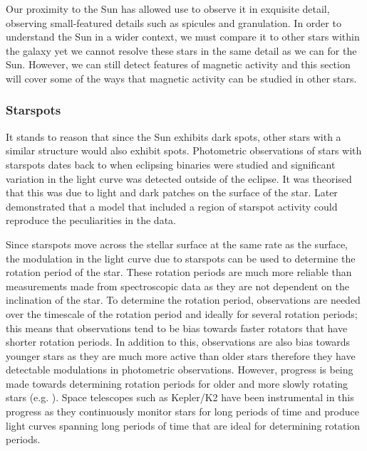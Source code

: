 Our proximity to the Sun has allowed use to observe it in exquisite detail, observing small-featured details such as spicules and granulation. In order to understand the Sun in a wider context, we must compare it to other stars within the galaxy yet we cannot resolve these stars in the same detail as we can for the Sun. However, we can still detect features of magnetic activity and this section will cover some of the ways that magnetic activity can be studied in other stars.

\subsubsection{Starspots}
\label{Chp1_starspots}
It stands to reason that since the Sun exhibits dark spots, other stars with a similar structure would also exhibit spots. Photometric observations of stars with starspots dates back to \citet{Kron_1947} when eclipsing binaries were studied and significant variation in the light curve was detected outside of the eclipse. It was theorised that this was due to light and dark patches on the surface of the star. Later \citet{Hall_1972} demonstrated that a model that included a region of starspot activity could reproduce the peculiarities in the data.

Since starspots move across the stellar surface at the same rate as the surface, the modulation in the light curve due to starspots can be used to determine the rotation period of the star. These rotation periods are much more reliable than measurements made from spectroscopic data as they are not dependent on the inclination of the star. To determine the rotation period, observations are needed over the timescale of the rotation period and ideally for several rotation periods; this means that observations tend to be bias towards faster rotators that have shorter rotation periods. In addition to this, observations are also bias towards younger stars as they are much more active than older stars therefore they have detectable modulations in photometric observations. However, progress is being made towards determining rotation periods for older and more slowly rotating stars (e.g. \citealt{Barnes_etal_2016,Douglas_etal_2016,Lanzafame_etal_2018}). Space telescopes such as Kepler/K2 have been instrumental in this progress as they continuously monitor stars for long periods of time and produce light curves spanning long periods of time that are ideal for determining rotation periods.

